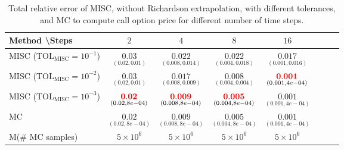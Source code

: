 \begin{table}[h!]
	\centering
	\begin{tabular}{l*{6}{c}r}
		Method \textbackslash  Steps            & $2$ & $4$ & $8$ & $16$  \\
		\hline

		MISC ($\text{TOL}_{\text{MISC}}=10^{-1}$)  &  $\underset{(0.02,0.01)}{\mathbf{0.03}}$ & $\underset{(0.008,0.014)}{\mathbf{0.022}}$& $\underset{(0.004,0.018)}{\mathbf{ 0.022}}$ & $\underset{(0.001,0.016)}{\mathbf{ 0.017}}$   \\

		MISC ($\text{TOL}_{\text{MISC}}=10^{-2}$)  &  $\underset{(0.02,0.01)}{\mathbf{0.03}}$ & $\underset{(0.008,0.009)}{\mathbf{0.017}}$& $\underset{(0.004,0.004)}{\mathbf{ 0.008}}$ & $\underset{(0.001,4e-04)}{\mathbf{ {\color{red}0.001}}}$  \\
		MISC ($\text{TOL}_{\text{MISC}}=10^{-3}$)  &  $\underset{(0.02,8e-04)}{\mathbf{{\color{red}0.02}}}$ & $\underset{(0.008,8e-04)}{{\color{red}\mathbf{0.009}}}$& $\underset{(0.004,8e-04)}{\mathbf{{\color{red}0.005}}}$  & $\underset{(0.001,4e-04)}{\mathbf{ 0.001}}$  \\

		\hline
		MC    & $\underset{(0.02,8e-04)}{\mathbf{0.02}}$  &  $\underset{(0.008,8e-04)}{\mathbf{0.009}}$  & $\underset{(0.004,8e-04)}{\mathbf{0.005}}$ & $\underset{(0.001,4e-04)}{\mathbf{0.001}}$  \\	
			M(\# MC samples) 	& $5 \times 10^6$  &  $5 \times 10^6$  & $5 \times 10^6$ & $5 \times 10^6$  \\
		\hline
	\end{tabular}
	\caption{Total relative error of MISC, without Richardson extrapolation,  with different tolerances, and MC to compute call option price for different number of time steps.}
	\label{Total error of MISC and MC to compute Call option price of the different tolerances for different number of time steps. Case set 3, without Richardson extrapolation. The numbers between parentheses are the corresponding absolute errors.}
\end{table}


